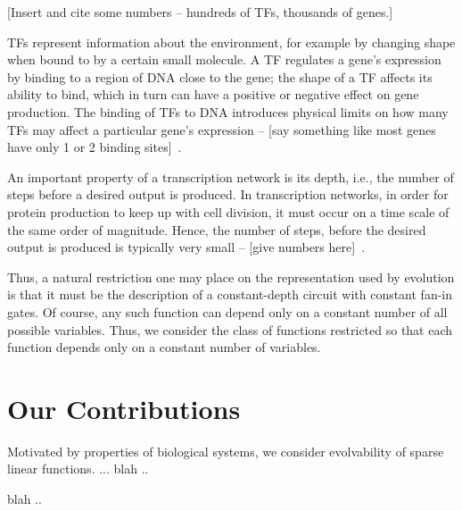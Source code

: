 [Insert and cite some numbers -- hundreds of TFs, thousands of genes.]

TFs represent information about the environment,
for example by changing shape when bound to by a certain small molecule.
A TF regulates a gene's expression by binding to a region of DNA close to the
gene; the shape of a TF affects its ability to bind,
which in turn can have a positive or negative effect on gene production.
The binding of TFs to DNA introduces physical limits on how many TFs may affect
a particular gene's expression --
[say something like most genes have only 1 or 2 binding sites]~\cite{biology}.

An important property of a transcription network is its depth, i.e.,
the number of steps before a desired output is produced. In transcription
networks, in order for protein production to keep up with cell division,
it must occur on a time scale of the same order of magnitude. Hence, the
number of steps, before the desired output is produced is typically very small
-- [give numbers here]~\cite{biology}.

Thus, a natural restriction one may place on the representation used by
evolution is that it must be the description of a constant-depth circuit with
constant fan-in gates. Of course, any such function can depend only on a
constant number of all possible variables. Thus, we consider the class of
functions restricted so that each function depends only on a constant number of
variables.


\section{Our Contributions}

Motivated by properties of biological systems, we consider evolvability of
sparse linear functions. ... blah ..

blah ..
